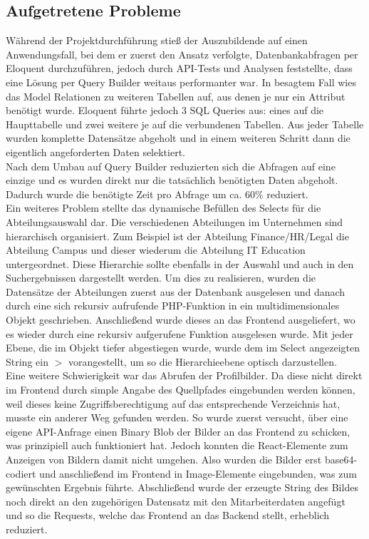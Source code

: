 \subsection{Aufgetretene Probleme}
    Während der Projektdurchführung stieß der Auszubildende auf einen Anwendungsfall, bei dem er zuerst den Ansatz verfolgte, Datenbankabfragen per Eloquent durchzuführen, jedoch durch API-Tests und Analysen feststellte, dass eine Lösung per Query Builder weitaus performanter war. In besagtem Fall wies das Model Relationen zu weiteren Tabellen auf, aus denen je nur ein Attribut benötigt wurde. Eloquent führte jedoch 3 SQL Queries aus: eines auf die Haupttabelle und zwei weitere je auf die verbundenen Tabellen. Aus jeder Tabelle wurden komplette Datensätze abgeholt und in einem weiteren Schritt dann die eigentlich angeforderten Daten selektiert.\\
    Nach dem Umbau auf Query Builder reduzierten sich die Abfragen auf eine einzige und es wurden direkt nur die tatsächlich benötigten Daten abgeholt. Dadurch wurde die benötigte Zeit pro Abfrage um ca. 60\% reduziert.
    \vspace{0.5cm}\\
    Ein weiteres Problem stellte das dynamische Befüllen des Selects für die Abteilungsauswahl dar. Die verschiedenen Abteilungen im Unternehmen sind hierarchisch organisiert. Zum Beispiel ist der Abteilung \glqq Finance/HR/Legal\grqq{} die Abteilung \glqq Campus\grqq{} und dieser wiederum die Abteilung \glqq IT Education\grqq{} untergeordnet. Diese Hierarchie sollte ebenfalls in der Auswahl und auch in den Suchergebnissen dargestellt werden. Um dies zu realisieren, wurden die Datensätze der Abteilungen zuerst aus der Datenbank ausgelesen und danach durch eine sich rekursiv aufrufende PHP-Funktion in ein multidimensionales Objekt geschrieben. Anschließend wurde dieses an das Frontend ausgeliefert, wo es wieder durch eine rekursiv aufgerufene Funktion ausgelesen wurde. Mit jeder Ebene, die im Objekt tiefer abgestiegen wurde, wurde dem im Select angezeigten String ein \glqq $>$\grqq{} vorangestellt, um so die Hierarchieebene optisch darzustellen.%
    \vspace{0.5cm}\\
    Eine weitere Schwierigkeit war das Abrufen der Profilbilder. Da diese nicht direkt im Frontend durch simple Angabe des Quellpfades eingebunden werden können, weil dieses keine Zugriffsberechtigung auf das entsprechende Verzeichnis hat, musste ein anderer Weg gefunden werden. So wurde zuerst versucht, über eine eigene API-Anfrage einen Binary Blob der Bilder an das Frontend zu schicken, was prinzipiell auch funktioniert hat. Jedoch konnten die React-Elemente zum Anzeigen von Bildern damit nicht umgehen. Also wurden die Bilder erst base64-codiert und anschließend im Frontend in Image-Elemente eingebunden, was zum gewünschten Ergebnis führte. Abschließend wurde der erzeugte String des Bildes noch direkt an den zugehörigen Datensatz mit den Mitarbeiterdaten angefügt und so die Requests, welche das Frontend an das Backend stellt, erheblich reduziert.
